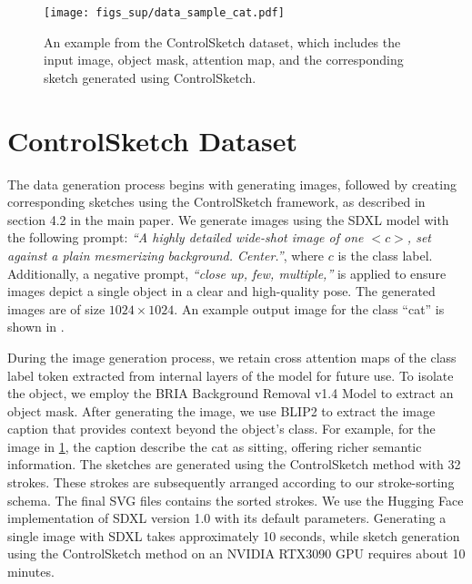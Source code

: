



\vspace{-0.2cm}









\begin{figure}
    \centering
    \texttt{[image: figs\_sup/data\_sample\_cat.pdf]}
    \caption{An example from the ControlSketch dataset, which includes the input image, object mask, attention map, and the corresponding sketch generated using ControlSketch.}
    \label{fig:data_sample}
\end{figure}

\section{ControlSketch Dataset}
The data generation process begins with generating images, followed by creating corresponding sketches using the ControlSketch framework, as described in section 4.2 in the main paper.
We generate images using the SDXL model \cite{podell2023sdxlimprovinglatentdiffusion} with the following prompt:
\textit{``A highly detailed wide-shot image of one $<c>$, set against a plain mesmerizing background. Center.''}, where $c$ is the class label.
Additionally, a negative prompt, \textit{``close up, few, multiple,''} is applied to ensure images depict a single object in a clear and high-quality pose. The generated images are of size $1024 \times 1024$. An example output image for the class ``cat'' is shown in .

During the image generation process, we retain cross attention maps of the class label token extracted from internal layers of the model for future use. To isolate the object, we employ the BRIA Background Removal v1.4 Model  \cite{briaRMBG} to extract an object mask. After generating the image, we use BLIP2 \cite{li2023blip2bootstrappinglanguageimagepretraining} to extract the image caption that provides context beyond the object’s class. For example, for the image in \cref{fig:data_sample}, the caption  describe the cat as sitting, offering richer semantic information.
The sketches are generated using the ControlSketch method with 32 strokes. These strokes are subsequently arranged according to our stroke-sorting schema. The final SVG files contains the sorted strokes.
We use the Hugging Face implementation of SDXL version 1.0 \cite{podell2023sdxlimprovinglatentdiffusion} with its default parameters. Generating a single image with SDXL takes approximately 10 seconds, while sketch generation using the ControlSketch method on an NVIDIA RTX3090 GPU requires about 10 minutes.

